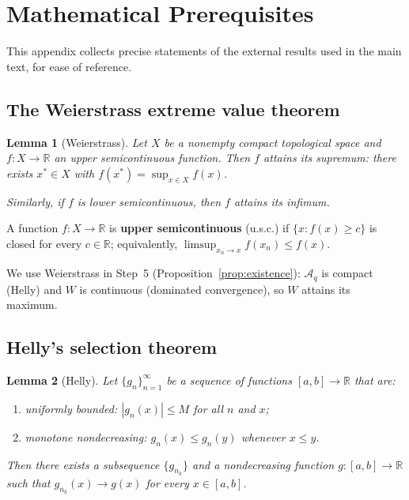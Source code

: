\documentclass[12pt,a4paper]{article}
\theoremstyle{definition}
\theoremstyle{plain}
\newtheorem{lemma}{Lemma}[section]
\theoremstyle{remark}
\newcommand{\R}{\mathbb{R}}
\newcommand{\calA}{\mathcal{A}}
\begin{document}
\section{Mathematical Prerequisites}
\label{app:prerequisites}

This appendix collects precise statements of the external
results used in the main text, for ease of reference.

\subsection{The Weierstrass extreme value theorem}

\begin{lemma}[Weierstrass]
\label{lem:weierstrass}
Let $X$ be a nonempty compact topological space and
$f: X \to \R$ an upper semicontinuous function.  Then $f$
attains its supremum: there exists $x^* \in X$ with
$f(x^*) = \sup_{x \in X} f(x)$.

Similarly, if $f$ is lower semicontinuous, then $f$ attains
its infimum.
\end{lemma}

A function $f: X \to \R$ is \textbf{upper semicontinuous}
(u.s.c.) if $\{x : f(x) \geq c\}$ is closed for every
$c \in \R$; equivalently, $\limsup_{x_n \to x} f(x_n)
\leq f(x)$.

We use Weierstrass in Step~5
(Proposition~\ref{prop:existence}): $\calA_q$ is compact
(Helly) and $W$ is continuous (dominated convergence), so
$W$ attains its maximum.


\subsection{Helly's selection theorem}

\begin{lemma}[Helly]
\label{lem:helly}
Let $\{g_n\}_{n=1}^\infty$ be a sequence of functions
$[a,b] \to \R$ that are:
\begin{enumerate}[label=(\roman*)]
\item uniformly bounded: $|g_n(x)| \leq M$ for all
  $n$ and $x$;
\item monotone nondecreasing: $g_n(x) \leq g_n(y)$
  whenever $x \leq y$.
\end{enumerate}
Then there exists a subsequence $\{g_{n_k}\}$ and a
nondecreasing function $g: [a,b] \to \R$ such that
$g_{n_k}(x) \to g(x)$ for every $x \in [a,b]$.
\end{lemma}
\end{document}
